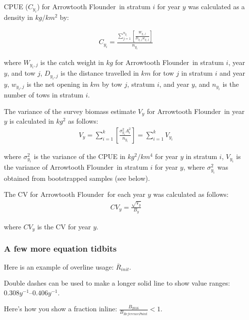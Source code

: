\documentclass[11pt]{book}\usepackage[]{graphicx}\usepackage[]{color}
\newcommand{\fishname}{Arrowtooth Flounder}
\begin{document}
CPUE ($C_{y_i}$) for \fishname\ in stratum $i$ for year $y$ was calculated as a density in $kg/km^2$ by:

\begin{align} \label{eq:cpuecalc}
C_{y_i}=\frac{\sum\limits_{j=1}^{n_{y_i}} \left[\frac{W_{y_i,j}}{D_{y_i,j}w_{y_i,j}}\right]}{n_{y_i}}
\end{align}
\begin{addmargin}[3em]{1em}
where $W_{y_i,j}$ is the catch weight in $kg$ for \fishname\ in stratum $i$, year $y$, and tow $j$, $D_{y_i,j}$ is the distance travelled in $km$ for tow $j$ in stratum $i$ and year $y$, $w_{y_i,j}$ is the net opening in $km$ by tow $j$, stratum $i$, and year $y$, and $n_{y_i}$ is the number of tows in stratum $i$.
\end{addmargin}

The variance of the survey biomass estimate $V_y$ for \fishname\ in year $y$ is calculated in $kg^2$ as follows:
\begin{align} \label{eq:indexvariance}
V_y=\sum_{i=1}^k\left[\frac{\sigma_{y_i}^2A_i^2}{n_{y_i}}\right]=\sum_{i=1}^kV_{y_i}
\end{align}
\begin{addmargin}[3em]{1em}
where $\sigma_{y_i}^2$ is the variance of the CPUE in $kg^2/km^4$ for year $y$ in stratum $i$, $V_{y_i}$ is the variance of \fishname\ in stratum $i$ for year $y$, where $\sigma_{y_i}^2$ was obtained from bootstrapped samples (see below).
\end{addmargin}

The CV for \fishname\ for each year $y$ was calculated as follows:
\begin{align} \label{eq:indexcv}
CV_y=\frac{\sqrt{V_y}}{B_y}
\end{align}
\begin{addmargin}[3em]{1em}
where $CV_y$ is the CV for year $y$.
\end{addmargin}

\subsubsection{A few more equation tidbits}

Here is an example of overline usage: $\overline{R}_{init}$.

Double dashes can be used to make a longer solid line to show value ranges: $0.308 y^{-1}$--$0.406 y^{-1}$.

Here's how you show a fraction inline: $\frac{B_{2016}}{B_{ReferencePoint}} < 1$.
\end{document}
